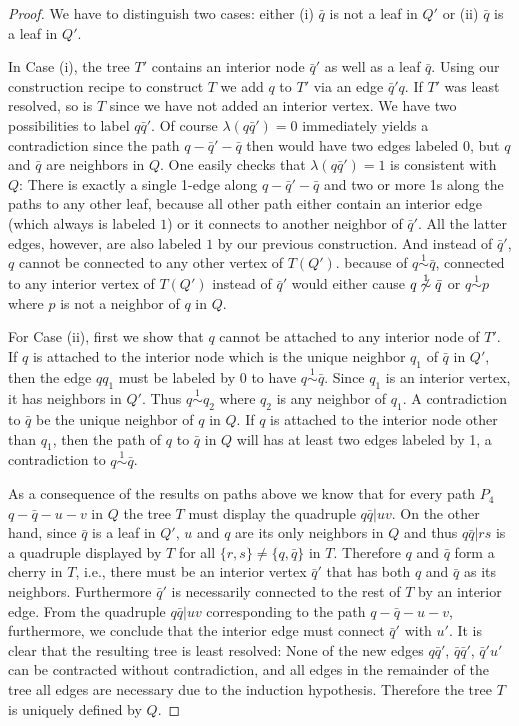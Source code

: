 \documentclass[smallextended]{svjour3}
\newcommand{\Rl}{\mathrel{\overset{1}{\sim}}}
\begin{document}
\begin{proof}
  We have to distinguish two cases: either (i) $\bar q$ is not a leaf in
  $Q'$ or (ii) $\bar q$ is a leaf in $Q'$.

  In Case (i), the tree $T'$ contains an interior node $\bar q'$ as well as
  a leaf $\bar q$.  Using our construction recipe to construct $T$ we add
  $q$ to $T'$ via an edge $\bar q' q$. If $T'$ was least resolved, so is
  $T$ since we have not added an interior vertex.  We have two
  possibilities to label $q\bar q'$.  Of course $\lambda(q\bar q')=0$
  immediately yields a contradiction since the path $q-\bar q'-\bar q$ then
  would have two edges labeled $0$, but $q$ and $\bar q$ are neighbors in
  $Q$. One easily checks that $\lambda(q\bar q')=1$ is consistent with $Q$:
  There is exactly a single 1-edge along $q-\bar q'-\bar q$ and two or more
  1s along the paths to any other leaf, because all other path either
  contain an interior edge (which always is labeled $1$) or it connects to
  another neighbor of $\bar q'$. All the latter edges, however, are also
  labeled $1$ by our previous construction.  And instead of $\bar q'$, $q$
  cannot be connected to any other vertex of $T(Q')$.  because of $q\Rl
  \bar q$, connected to any interior vertex of $T(Q')$ instead of $\bar q'$
  would either cause $q\not \Rl \bar q$ or $q\Rl p$ where $p$ is not a
  neighbor of $q$ in $Q$.
 
  For Case (ii), first we show that $q$ cannot be attached to any interior
  node of $T'$. If $q$ is attached to the interior node which is the unique
  neighbor $q_1$ of $\bar q$ in $Q'$, then the edge $qq_1$ must be labeled
  by 0 to have $q\Rl \bar q$. Since $q_1$ is an interior vertex, it has
  neighbors in $Q'$. Thus $q\Rl q_2$ where $q_2$ is any neighbor of
  $q_1$. A contradiction to $\bar q$ be the unique neighbor of $q$ in
  $Q$. If $q$ is attached to the interior node other than $q_1$, then the
  path of $q$ to $\bar q$ in $Q$ will has at least two edges labeled by 1,
  a contradiction to $q \Rl \bar q$.
  
  As a consequence of the results on paths above we know that for every
  path $P_4$ $q-\bar q-u-v$ in $Q$ the tree $T$ must display the quadruple
  $q\bar q|uv$. On the other hand, since $\bar q$ is a leaf in $Q'$, $u$
  and $q$ are its only neighbors in $Q$ and thus $q\bar q|rs$ is a
  quadruple displayed by $T$ for all $\{r,s\}\ne\{q,\bar q\}$ in
  $T$. Therefore $q$ and $\bar q$ form a cherry in $T$, i.e., there must be
  an interior vertex $\bar q'$ that has both $q$ and $\bar q$ as its
  neighbors. Furthermore $\bar q'$ is necessarily connected to the rest of
  $T$ by an interior edge. From the quadruple $q\bar q|uv$ corresponding to
  the path $q-\bar q-u-v$, furthermore, we conclude that the interior edge
  must connect $\bar q'$ with $u'$. It is clear that the resulting tree is
  least resolved: None of the new edges $q\bar q'$, $\bar q\bar q'$, $\bar
  q'u'$ can be contracted without contradiction, and all edges in the
  remainder of the tree all edges are necessary due to the induction
  hypothesis. Therefore the tree $T$ is uniquely defined by $Q$.


\end{proof}
\end{document}
